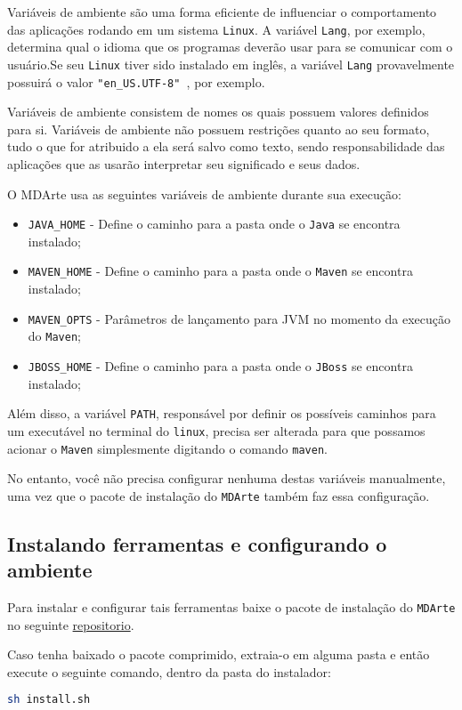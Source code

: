 Variáveis de ambiente são uma forma eficiente de influenciar o comportamento das
aplicações rodando em um sistema \texttt{Linux}. A variável \texttt{Lang}, por
exemplo, determina qual o idioma que os programas deverão usar para se comunicar
com o usuário.Se seu \texttt{Linux} tiver sido instalado em inglês, a variável \texttt{Lang}
provavelmente possuirá o valor \texttt{"en\_US.UTF-8" }, por exemplo.

Variáveis de ambiente consistem de nomes os quais possuem valores definidos para
si. Variáveis de ambiente não possuem restrições quanto ao seu formato, tudo o
que for atribuido a ela será salvo como texto, sendo responsabilidade das
aplicações que as usarão interpretar seu significado e seus dados. 

O MDArte usa as seguintes variáveis de ambiente durante sua execução:
\begin{itemize}
  \item \texttt{JAVA_HOME} - Define o caminho para a pasta onde o \texttt{Java}
  se encontra instalado;
  \item \texttt{MAVEN_HOME} - Define o caminho para a pasta onde o
  \texttt{Maven} se encontra instalado;
  \item \texttt{MAVEN_OPTS} - Parâmetros de lançamento para JVM no momento da
  execução do \texttt{Maven};
  \item \texttt{JBOSS_HOME} - Define o caminho para a pasta onde o
  \texttt{JBoss} se encontra instalado;
\end{itemize}

Além disso, a variável \texttt{PATH}, responsável por definir os possíveis
caminhos para um executável no terminal do \texttt{linux}, precisa ser alterada
para que possamos acionar o \texttt{Maven} simplesmente digitando o comando
\texttt{maven}.

No entanto, você não precisa configurar nenhuma destas variáveis manualmente,
uma vez que o pacote de instalação do \texttt{MDArte} também faz essa
configuração.

\subsection{Instalando ferramentas e configurando o ambiente}
Para instalar e configurar tais ferramentas baixe o pacote de instalação do
\texttt{MDArte} no seguinte
\href{https://github.com/MDArte/mdarte-installer}{repositorio}.

Caso tenha baixado o pacote comprimido, extraia-o em alguma pasta e então
execute o seguinte comando, dentro da pasta do instalador:
\begin{lstlisting}[language=bash]
	sh install.sh
\end{lstlisting}


